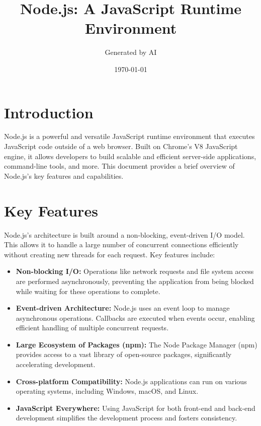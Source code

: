 \documentclass{article}
\title{Node.js: A JavaScript Runtime Environment}
\author{Generated by AI}
\date{\today}
\begin{document}
\maketitle

\section{Introduction}

Node.js is a powerful and versatile JavaScript runtime environment that executes JavaScript code outside of a web browser.  Built on Chrome's V8 JavaScript engine, it allows developers to build scalable and efficient server-side applications, command-line tools, and more.  This document provides a brief overview of Node.js's key features and capabilities.


\section{Key Features}

Node.js's architecture is built around a non-blocking, event-driven I/O model. This allows it to handle a large number of concurrent connections efficiently without creating new threads for each request.  Key features include:

\begin{itemize}
    \item \textbf{Non-blocking I/O:}  Operations like network requests and file system access are performed asynchronously, preventing the application from being blocked while waiting for these operations to complete.
    \item \textbf{Event-driven Architecture:}  Node.js uses an event loop to manage asynchronous operations.  Callbacks are executed when events occur, enabling efficient handling of multiple concurrent requests.
    \item \textbf{Large Ecosystem of Packages (npm):} The Node Package Manager (npm) provides access to a vast library of open-source packages, significantly accelerating development.
    \item \textbf{Cross-platform Compatibility:} Node.js applications can run on various operating systems, including Windows, macOS, and Linux.
    \item \textbf{JavaScript Everywhere:}  Using JavaScript for both front-end and back-end development simplifies the development process and fosters consistency.
\end{itemize}
\end{document}
